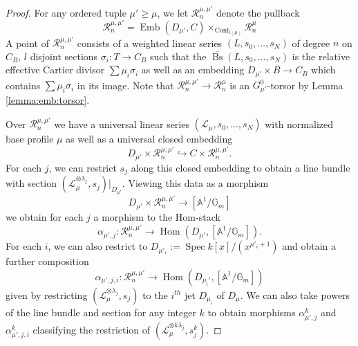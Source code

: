 \documentclass[a4paper,12pt]{amsart}
\theoremstyle{definition}
\newcommand{\bG}{\mathbb{G}}
\newcommand{\bA}{\mathbb{A}}
\newcommand{\cL}{\mathcal{L}}
\newcommand{\cR}{\mathcal{R}}
\DeclareMathOperator{\Bs}{Bs}
\DeclareMathOperator{\Emb}{Emb}
\DeclareMathOperator{\Conf}{Conf}
\DeclareMathOperator{\Spec}{Spec}
\DeclareMathOperator{\Hom}{Hom}
\begin{document}
	\begin{proof}
		For any ordered tuple $\mu' \geq \mu$, we let $\cR^{\mu, \mu'}_n$ denote the pullback
		$$
		\cR^{\mu, \mu'}_n = \Emb(D_{\mu'}, C) \times_{\Conf_{l(\mu)}} \cR^{\mu}_n
		$$
		A point of $\cR^{\mu,\mu'}_n$ consists of a weighted linear series $(L, s_0, \ldots, s_N)$ of degree $n$ on $C_B$, $l$ disjoint sections $\sigma_i : T \to C_B$ such that the $\overline{\Bs}(L, s_0, \ldots, s_N)$ is the relative effective Cartier divisor $\sum \mu_i \sigma_i$ as well as an embedding $D_{\mu'} \times B \to C_B$ which contains $\sum \mu_i \sigma_i$ in its image. Note that $\cR^{\mu, \mu'}_n \to \cR^{\mu}_n$ is an $G^0_{\mu'}$-torsor by Lemma \ref{lemma:emb:torsor}. 
		
		Over $\cR^{\mu,\mu'}_n$ we have a universal linear series $(\cL_{\mu}, s_0, \ldots, s_N)$ with normalized base profile $\mu$ as well as a universal closed embedding
		$$
		D_{\mu'} \times \cR^{\mu, \mu'}_n \hookrightarrow  C \times \cR^{\mu,\mu'}_n.
		$$
		For each $j$, we can restrict $s_j$ along this closed embedding to obtain a line bundle with section $(\cL_{\mu}^{\otimes \lambda_j}, s_j)|_{D_{\mu'}}$. Viewing this data as a morphism
		$$
		D_{\mu'} \times \cR^{\mu, \mu'}_n \to [\mathbb{A}^1/\bG_m]
		$$
		we obtain for each $j$ a morphism to the Hom-stack
		$$
		\alpha_{\mu',j} : \cR^{\mu, \mu'}_n \to \Hom(D_{\mu'}, [\mathbb{A}^1/\bG_m]). 
		$$
		For each $i$, we can also restrict to $D_{\mu'_i} := \Spec k[x]/(x^{\mu'_i+1})$ and obtain a further composition
		$$
		\alpha_{\mu',j,i} : \cR^{\mu,\mu'}_n \to \Hom(D_{\mu_i'}, [\bA^1/\bG_m]) 
		$$
		given by restricting $(\cL_{\mu}^{\otimes \lambda_j}, s_j)$ to the $i^{th}$ jet $D_{\mu_i}$ of $D_{\mu}$. We can also take powers of the line bundle and section for any integer $k$ to obtain morphisms $\alpha_{\mu',j}^k$ and $\alpha_{\mu',j,i}^k$ classifying the restriction of $(\cL_\mu^{\otimes k \lambda_j}, s_j^k)$. 
		

\end{proof}
\end{document}
